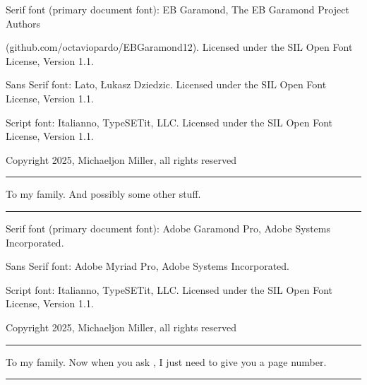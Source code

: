     \NewDocumentCommand \ColophonFonts{}
    {
        Serif font (primary document font):
        EB Garamond, \Copyright{} The EB Garamond Project Authors\par
        \quad (github.com/octaviopardo/EBGaramond12). Licensed under the SIL Open Font License, Version 1.1.\par
        Sans Serif font:
        Lato, \Copyright{} Łukasz Dziedzic. Licensed under the SIL Open Font License, Version 1.1.\par
        Script font: Italianno, \Copyright{} TypeSETit, LLC. Licensed under the SIL Open Font License, Version 1.1.\par
    }

    \NewDocumentCommand \CopyrightInfo{}
    {Copyright \Copyright{} 2025, Michaeljon Miller, all rights reserved}

    \NewDocumentCommand \MyDedication{}
    {\hrule\vspace{5pt} To my family. And possibly some other stuff. \vspace{5pt}\hrule}

    \NewDocumentCommand \DedicationVerso{}{}

\else
    \NewDocumentCommand \MyTitlePage{} {\noindent \MakeTitlePage{} \clearpage}

    \NewDocumentCommand \ColophonFonts{}
    {
        Serif font (primary document font):
        Adobe Garamond Pro, \Copyright{} Adobe Systems Incorporated.\par
        Sans Serif font:
        Adobe Myriad Pro, \Copyright{} Adobe Systems Incorporated.\par
        Script font: Italianno, \Copyright{} TypeSETit, LLC. Licensed under the SIL Open Font License, Version 1.1.\par
    }

    \NewDocumentCommand \CopyrightInfo{}
    {Copyright \Copyright{} 2025, Michaeljon Miller, all rights reserved}

    \NewDocumentCommand \MyDedication{}
    {\hrule\vspace{5pt}
        To my family.  Now when you ask , I just need to give you a page number.%
        \vspace{5pt}\hrule}

